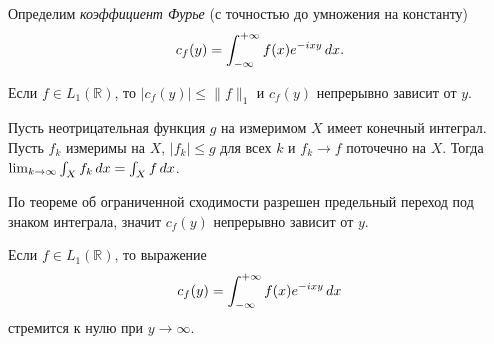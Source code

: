 
\begin{to_def}
    Определим \textit{коэффициент Фурье} (с точностью до умножения на константу)
    \begin{equation*}
        c_f (y) = \int_{-\infty}^{+\infty} f(x) e^{-ixy} \, d x.
    \end{equation*}
\end{to_def}

\begin{to_thr}[]
    Если $f \in L_1 (\mathbb{R})$, то $|c_f (y)| \leq \|f\|_1$ и $c_f (y)$ непрерывно зависит от $y$.
\end{to_thr}

\textcolor{ugray}{
\begin{to_thr}
    Пусть неотрицательная функция $g$ на измеримом $X$ имеет конечный интеграл. Пусть $f_k$ измеримы на $X$, $|f_k| \leq g$ для всех $k$ и $f_k \to f$ поточечно на $X$. Тогда
    $\lim_{k \to \infty} \int_X f_k \, d x = \int_X f \, d x$.
\end{to_thr}   
}

\begin{uproof}
    По теореме об ограниченной сходимости разрешен предельный переход под знаком интеграла, значит $c_f (y)$ непрерывно зависит от $y$. 
\end{uproof}

\begin{to_thr}
    Если $f \in L_1 (\mathbb{R})$, то выражение
    \begin{equation*}
        c_f (y) = \int_{-\infty}^{+\infty} f(x) e^{-ixy} \, d x
    \end{equation*}
    стремится к нулю при $y \to \infty$.
\end{to_thr}


